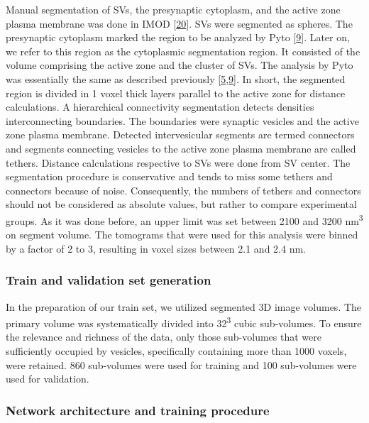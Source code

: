 Manual segmentation of SVs, the presynaptic cytoplasm, and the active zone plasma membrane was done in IMOD {[}\protect\hyperlink{ref-136NHHp17}{20}{]}.
SVs were segmented as spheres.
The presynaptic cytoplasm marked the region to be analyzed by Pyto {[}\protect\hyperlink{ref-1HtRUUZQi}{9}{]}.
Later on, we refer to this region as the cytoplasmic segmentation region.
It consisted of the volume comprising the active zone and the cluster of SVs.
The analysis by Pyto was essentially the same as described previously {[}\protect\hyperlink{ref-XQJ3R1HJ}{5},\protect\hyperlink{ref-1HtRUUZQi}{9}{]}.
In short, the segmented region is divided in 1 voxel thick layers parallel to the active zone for distance calculations.
A hierarchical connectivity segmentation detects densities interconnecting boundaries.
The boundaries were synaptic vesicles and the active zone plasma membrane.
Detected intervesicular segments are termed connectors and segments connecting vesicles to the active zone plasma membrane are called tethers.
Distance calculations respective to SVs were done from SV center.
The segmentation procedure is conservative and tends to miss some tethers and connectors because of noise.
Consequently, the numbers of tethers and connectors should not be considered as absolute values, but rather to compare experimental groups.
As it was done before, an upper limit was set between 2100 and 3200 nm\textsuperscript{3} on segment volume.
The tomograms that were used for this analysis were binned by a factor of 2 to 3, resulting in voxel sizes between 2.1 and 2.4 nm.

\hypertarget{train-and-validation-set-generation}{%
\subsubsection{Train and validation set generation}\label{train-and-validation-set-generation}}

In the preparation of our train set, we utilized segmented 3D image volumes.
The primary volume was systematically divided into 32\textsuperscript{3} cubic sub-volumes.
To ensure the relevance and richness of the data, only those sub-volumes that were sufficiently occupied by vesicles, specifically containing more than 1000 voxels, were retained.
860 sub-volumes were used for training and 100 sub-volumes were used for validation.

\hypertarget{network-architecture-and-training-procedure}{%
\subsubsection{Network architecture and training procedure}\label{network-architecture-and-training-procedure}}

